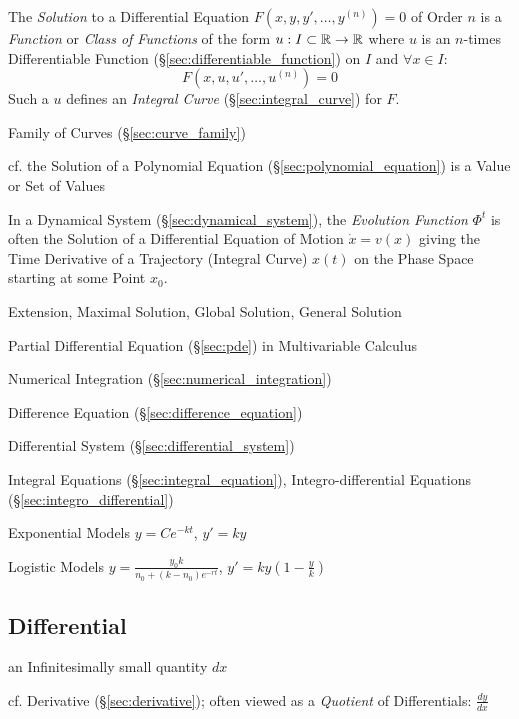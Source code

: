 The \emph{Solution} to a Differential Equation $F(x,y,y',\ldots,y^{(n)}) = 0$
of Order $n$ is a \emph{Function} or \emph{Class of Functions} of the form $u :
I \subset \mathbb{R} \rightarrow \mathbb{R}$ where $u$ is an $n$-times Differentiable
Function (\S\ref{sec:differentiable_function}) on $I$ and $\forall x \in I$:
\[
  F(x,u,u',\ldots,u^{(n)}) = 0
\]
Such a $u$ defines an \emph{Integral Curve} (\S\ref{sec:integral_curve}) for
$F$.

\fist Family of Curves (\S\ref{sec:curve_family})

\fist cf. the Solution of a Polynomial Equation
(\S\ref{sec:polynomial_equation}) is a Value or Set of Values

In a Dynamical System (\S\ref{sec:dynamical_system}), the \emph{Evolution
  Function} $\Phi^t$ is often the Solution of a Differential Equation of Motion
$\dot{x} = v(x)$ giving the Time Derivative of a Trajectory (Integral Curve)
$x(t)$ on the Phase Space starting at some Point $x_0$.

Extension, Maximal Solution, Global Solution, General Solution

\fist Partial Differential Equation (\S\ref{sec:pde}) in Multivariable Calculus

\fist Numerical Integration (\S\ref{sec:numerical_integration})

\fist Difference Equation (\S\ref{sec:difference_equation})

\fist Differential System (\S\ref{sec:differential_system})

\fist Integral Equations (\S\ref{sec:integral_equation}), Integro-differential
Equations (\S\ref{sec:integro_differential})

Exponential Models $y = Ce^{-kt}$, $y' = ky$

Logistic Models $y = \frac{y_0 k}{n_0 + (k-n_0)e^{-rt}}$,
  $y' = ky (1 - \frac{y}{k})$



\subsection{Differential}\label{sec:differential}

an Infinitesimally small quantity $dx$

cf. Derivative (\S\ref{sec:derivative}); often viewed as a \emph{Quotient} of
Differentials: $\frac{dy}{dx}$

